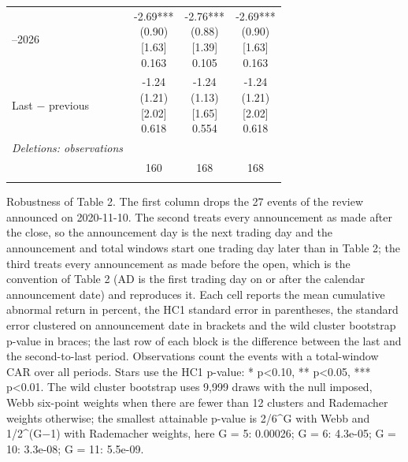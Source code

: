 \begin{threeparttable}
\begin{tabular}{@{}lccc}
\addlinespace[0.25ex]
\addlinespace[0.25ex]
2024–2026 & \makecell{-2.69***\\(0.90)\\{}[1.63]\\{0.163}} & \makecell{-2.76***\\(0.88)\\{}[1.39]\\{0.105}} & \makecell{-2.69***\\(0.90)\\{}[1.63]\\{0.163}} \\
\addlinespace[0.25ex]
\addlinespace[0.25ex]
Last $-$ previous & \makecell{-1.24\\(1.21)\\{}[2.02]\\{0.618}} & \makecell{-1.24\\(1.13)\\{}[1.65]\\{0.554}} & \makecell{-1.24\\(1.21)\\{}[2.02]\\{0.618}} \\
\addlinespace[0.25ex]
\midrule
\emph{Deletions: observations} \\
\addlinespace[0.25ex]
\addlinespace[1ex]
 & 160 & 168 & 168 \\
\addlinespace[0.25ex]
\bottomrule
\end{tabular}
\endgroup
\noindent\begin{minipage}{\linewidth}\smallskip\footnotesize
Robustness of Table 2. The first column drops the 27 events of the review announced on 2020-11-10. The second treats every announcement as made after the close, so the announcement day is the next trading day and the announcement and total windows start one trading day later than in Table 2; the third treats every announcement as made before the open, which is the convention of Table 2 (AD is the first trading day on or after the calendar announcement date) and reproduces it. Each cell reports the mean cumulative abnormal return in percent, the HC1 standard error in parentheses, the standard error clustered on announcement date in brackets and the wild cluster bootstrap p-value in braces; the last row of each block is the difference between the last and the second-to-last period. Observations count the events with a total-window CAR over all periods. Stars use the HC1 p-value: * p<0.10, ** p<0.05, *** p<0.01. The wild cluster bootstrap uses 9,999 draws with the null imposed, Webb six-point weights when there are fewer than 12 clusters and Rademacher weights otherwise; the smallest attainable p-value is 2/6\textasciicircum{}G with Webb and 1/2\textasciicircum{}(G$-$1) with Rademacher weights, here G = 5: 0.00026; G = 6: 4.3e-05; G = 10: 3.3e-08; G = 11: 5.5e-09.\end{minipage}

\end{threeparttable}